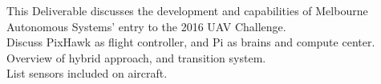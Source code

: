 This Deliverable discusses the development and capabilities of Melbourne Autonomous Systems' entry to the 2016 UAV Challenge.\\

Discuss PixHawk as flight controller, and Pi as brains and compute center.\\

Overview of hybrid approach, and transition system.\\

List sensors included on aircraft.\\